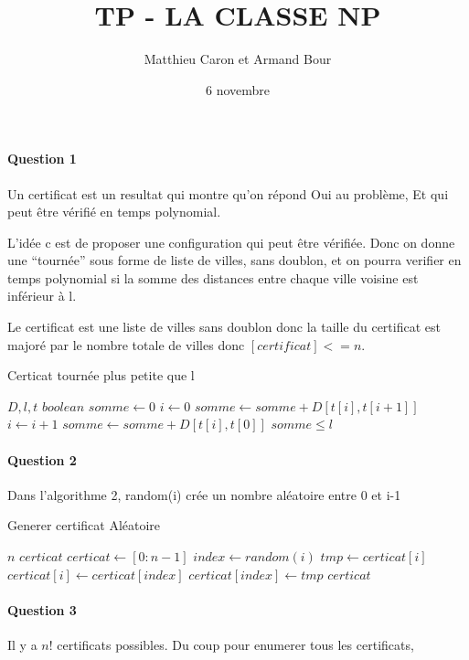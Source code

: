 \documentclass[a4paper,10pt]{article}
\title{TP - LA CLASSE NP}
\author{Matthieu Caron et Armand Bour}
\date{6 novembre}
\begin{document}
\maketitle

\paragraph{Question 1}
Un certificat est un resultat qui montre qu'on répond Oui au problème,
Et qui peut être vérifié en temps polynomial.

L'idée c est de proposer une configuration qui peut être vérifiée.
Donc on donne une ``tournée'' sous forme de liste de villes, sans doublon,
et on pourra verifier en temps polynomial si la somme des distances entre chaque ville
voisine est inférieur à l.

Le certificat est une liste de villes sans doublon donc la taille du certificat est majoré
par le nombre totale de villes donc $[certificat]<=n$.



\begin{algorithm}
\caption{Certicat tournée plus petite que l}
\begin{algorithmic}
\REQUIRE $D, l, t$
\ENSURE $boolean$
\STATE $somme \leftarrow 0$
\STATE $i \leftarrow 0$
  \STATE $somme \leftarrow somme + D[t[i],t[i+1]] $
  \STATE $i \leftarrow i + 1 $
\ENDWHILE
\STATE $somme \leftarrow somme + D[t[i],t[0]] $
\RETURN $somme \leq l $ 
\end{algorithmic}
\end{algorithm}

\paragraph{Question 2}
Dans l'algorithme 2, random(i) crée un nombre aléatoire entre 0 et i-1

\begin{algorithm}
\caption{Generer certificat Aléatoire}
\begin{algorithmic}
\REQUIRE $n$
\ENSURE $certicat$
\STATE $certicat \leftarrow [0:n-1] $
  \STATE $index \leftarrow random(i)$
  \STATE $tmp \leftarrow certicat[i] $
  \STATE $certicat[i]  \leftarrow certicat[index] $
  \STATE $certicat[index] \leftarrow tmp $
\ENDFOR
\RETURN $certicat$
\end{algorithmic}
\end{algorithm}


\paragraph{Question 3}
Il  y a $n!$ certificats possibles. Du coup pour enumerer tous les certificats,
\end{document}
